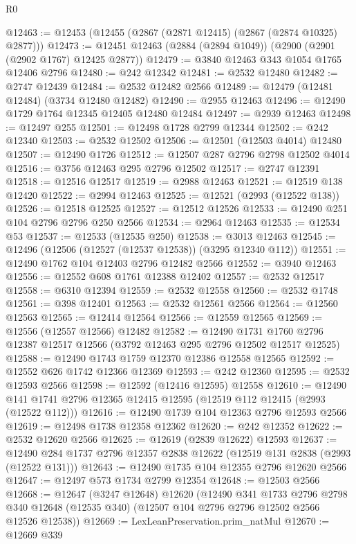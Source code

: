 \begin{lexlean}{R0}
\begin{coremodule}
@12463 := @12453 (@12455 (@2867 (@2871 @12415) (@2867 (@2874 @10325) @2877)))
@12473 := @12451 @12463 (@2884 (@2894 @1049)) (@2900 (@2901 (@2902 @1767) @12425 @2877))
@12479 := @3840 @12463 @343 @1054 @1765 @12406 @2796
@12480 := @242 @12342
@12481 := @2532 @12480
@12482 := @2747 @12439
@12484 := @2532 @12482 @2566
@12489 := @12479 (@12481 @12484) (@3734 @12480 @12482)
@12490 := @2955 @12463
@12496 := @12490 @1729 @1764 @12345 @12405 @12480 @12484
@12497 := @2939 @12463
@12498 := @12497 @255
@12501 := @12498 @1728 @2799 @12344
@12502 := @242 @12340
@12503 := @2532 @12502
@12506 := @12501 (@12503 @4014) @12480
@12507 := @12490 @1726
@12512 := @12507 @287 @2796 @2798 @12502 @4014
@12516 := @3756 @12463 @295 @2796 @12502
@12517 := @2747 @12391
@12518 := @12516 @12517
@12519 := @2988 @12463
@12521 := @12519 @138 @12420
@12522 := @2994 @12463
@12525 := @12521 (@2993 (@12522 @138))
@12526 := @12518 @12525
@12527 := @12512 @12526
@12533 := @12490 @251 @104 @2796 @2796 @250 @2566
@12534 := @2964 @12463
@12535 := @12534 @53
@12537 := @12533 (@12535 @250)
@12538 := @3013 @12463
@12545 := @12496 (@12506 (@12527 (@12537 @12538)) (@3295 @12340 @112))
@12551 := @12490 @1762 @104 @12403 @2796 @12482 @2566
@12552 := @3940 @12463
@12556 := @12552 @608 @1761 @12388 @12402
@12557 := @2532 @12517
@12558 := @6310 @12394
@12559 := @2532 @12558
@12560 := @2532 @1748
@12561 := @398 @12401
@12563 := @2532 @12561 @2566
@12564 := @12560 @12563
@12565 := @12414 @12564
@12566 := @12559 @12565
@12569 := @12556 (@12557 @12566) @12482
@12582 := @12490
    @1731
    @1760
    @2796
    @12387
    @12517
    @12566
    (@3792 @12463 @295 @2796 @12502 @12517 @12525)
@12588 := @12490 @1743 @1759 @12370 @12386 @12558 @12565
@12592 := @12552 @626 @1742 @12366 @12369
@12593 := @242 @12360
@12595 := @2532 @12593 @2566
@12598 := @12592 (@12416 @12595) @12558
@12610 := @12490 @141 @1741 @2796 @12365 @12415 @12595 (@12519 @112 @12415 (@2993 (@12522 @112)))
@12616 := @12490 @1739 @104 @12363 @2796 @12593 @2566
@12619 := @12498 @1738 @12358 @12362
@12620 := @242 @12352
@12622 := @2532 @12620 @2566
@12625 := @12619 (@2839 @12622) @12593
@12637 := @12490 @284 @1737 @2796 @12357 @2838 @12622 (@12519 @131 @2838 (@2993 (@12522 @131)))
@12643 := @12490 @1735 @104 @12355 @2796 @12620 @2566
@12647 := @12497 @573 @1734 @2799 @12354
@12648 := @12503 @2566
@12668 := @12647
    (@3247 @12648)
    @12620
    (@12490
      @341
      @1733
      @2796
      @2798
      @340
      @12648
      (@12535 @340)
      (@12507 @104 @2796 @2796 @12502 @2566 @12526 @12538))
@12669 := LexLeanPreservation.prim_natMul
@12670 := @12669 @339

\end{coremodule}
\end{lexlean}
